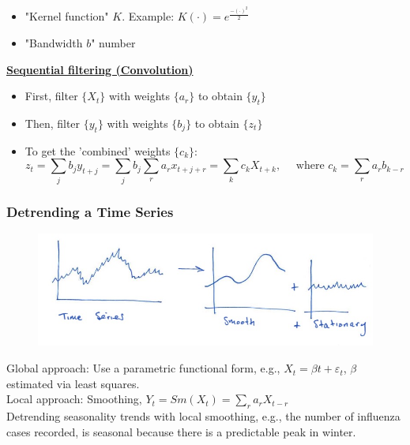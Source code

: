 \begin{itemize}
    \item "Kernel function" $K$. \quad Example: $K(\cdot)=e^{\frac{-(\cdot)^2}{2}}$
    \item "Bandwidth $b$" number 
\end{itemize}

\textbf{\underline{Sequential filtering (Convolution)}}

\bigskip

\begin{itemize}
    \item First, filter $\{X_t\}$ with weights $\{a_r\}$ to obtain $\{y_t\}$
    \item Then, filter $\{y_t\}$ with weights $\{b_j\}$ to obtain $\{z_t\}$
    \item To get the 'combined' weights $\{c_k\}$:
        \[
        z_t=\sum_j b_j y_{t+j}=\sum_jb_j \sum_r a_r x_{t+j+r} = \sum_k c_k X_{t+k}, \quad \text{ where } c_k=\sum_r a_r b_{k-r}
        \]
\end{itemize}

\subsubsection{Detrending a Time Series}

\begin{figure}[H]
\includegraphics[scale=0.4]{images/Screenshot 2024-03-30 at 15.07.16.jpg}
\centering
\end{figure}

Global approach: Use a parametric functional form, e.g., $X_t=\beta t+\varepsilon_t$, $\beta$ estimated via least squares. \\

Local approach: Smoothing, $Y_t=Sm(X_t)=\sum_r a_r X_{t-r}$ \\

Detrending seasonality trends with local smoothing, e.g., the number of influenza cases recorded, is seasonal because there is a predictable peak in winter.\\

